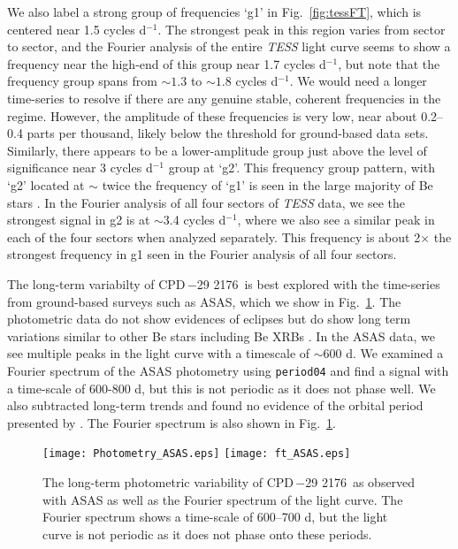 \documentclass[]{aastex631}
\newcommand{\target}{CPD\,$-$29 2176}
\begin{document}
We also label a strong group of frequencies `g1' in Fig.~\ref{fig:tessFT}, which is centered near 1.5 cycles d$^{-1}$. The strongest peak in this region varies from sector to sector, and the Fourier analysis of the entire \textit{TESS} light curve seems to show a frequency near the high-end of this group near 1.7 cycles d$^{-1}$, but note that the frequency group spans from $\sim 1.3$ to $\sim 1.8$ cycles d$^{-1}$. We would need a longer time-series to resolve if there are any genuine stable, coherent frequencies in the regime. However, the amplitude of these frequencies is very low, near about 0.2--0.4 parts per thousand, likely below the threshold for ground-based data sets. Similarly, there appears to be a lower-amplitude group just above the level of significance near 3 cycles d$^{-1}$ group at `g2'. This frequency group pattern, with `g2' located at $\sim$ twice the frequency of `g1' is seen in the large majority of Be stars \citep{2022AJ....163..226L, 2018A&A...613A..70S}. In the Fourier analysis of all four sectors of \textit{TESS} data, we see the strongest signal in g2 is at $\sim$3.4 cycles d$^{-1}$, where we also see a similar peak in each of the four sectors when analyzed separately. This frequency is about 2$\times$ the strongest frequency in g1 seen in the Fourier analysis of all four sectors. 


The long-term variabilty of \target\ is best explored with the time-series from ground-based surveys such as ASAS, which we show in Fig.~\ref{fig:Photometry}. The photometric data do not show evidences of eclipses but do show long term variations similar to other Be stars \citep{2017AJ....153..252L,2018MNRAS.479.2909B} including Be XRBs \citep{2015A&A...574A..33R,2023A&A...671A..48R}.
In the ASAS data, we see multiple peaks in the light curve with a timescale of $\sim600$ d. We examined a Fourier spectrum of the ASAS photometry using {\tt period04} \citep{2005CoAst.146...53L} and find a signal with a time-scale of 600-800 d, but this is not periodic as it does not phase well. We also subtracted long-term trends and found no evidence of the orbital period presented by \citet{noel}. The Fourier spectrum is also shown in Fig.~\ref{fig:Photometry}.





\begin{figure}
    \centering
    \texttt{[image: Photometry\_ASAS.eps]}
    \texttt{[image: ft\_ASAS.eps]} %
    \caption{The long-term photometric variability of \target\ as observed with ASAS as well as the Fourier spectrum of the light curve. The Fourier spectrum shows a time-scale of 600--700 d, but the light curve is not periodic as it does not phase onto these periods.  }
    \label{fig:Photometry}
\end{figure}
\end{document}
